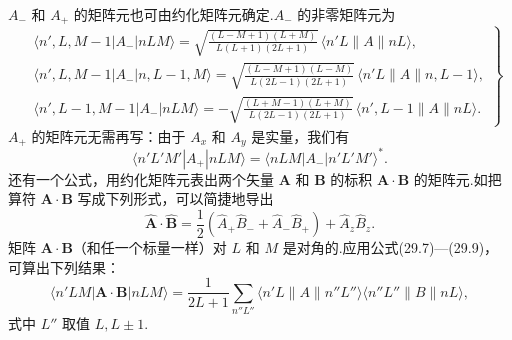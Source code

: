 $A_-$ 和 $A_+$ 的矩阵元也可由约化矩阵元确定.$A_-$ 的非零矩阵元为
\begin{equation}
\left.\begin{aligned}
  &\langle n',L,M-1|A_-|nLM\rangle
  =\sqrt{\frac{(L-M+1)(L+M)}{L(L+1)(2L+1)}}\,
  \langle n'L\parallel A\parallel nL\rangle,\\
  &\langle n',L,M-1|A_-|n,L-1,M\rangle
  =\sqrt{\frac{(L-M+1)(L-M)}{L(2L-1)(2L+1)}}\,
  \langle n'L\parallel A\parallel n,L-1\rangle,\\
  &\langle n',L-1,M-1|A_-|nLM\rangle
  =-\sqrt{\frac{(L+M-1)(L+M)}{L(2L-1)(2L+1)}}\,
  \langle n',L-1\parallel A\parallel nL\rangle.
\end{aligned}\right\}
\end{equation}
$A_+$ 的矩阵元无需再写：由于 $A_x$ 和 $A_y$ 是实量，我们有
\begin{equation}
  \langle n'L'M'|A_+|nLM\rangle
  =\langle nLM|A_-|n'L'M'\rangle^{*}.
\end{equation}
还有一个公式，用约化矩阵元表出两个矢量 $\boldsymbol{A}$ 和 $\boldsymbol{B}$ 的标积 $\boldsymbol{A}\cdot\boldsymbol{B}$ 的矩阵元.如把算符 $\boldsymbol{A}\cdot\boldsymbol{B}$ 写成下列形式，可以简捷地导出
\begin{equation}
  \hat{\boldsymbol{A}}\cdot\hat{\boldsymbol{B}}
  =\frac{1}{2}\left(\hat{A}_+\hat{B}_-+\hat{A}_-\hat{B}_+\right)
  +\hat{A}_z\hat{B}_z.
\end{equation}
矩阵 $\boldsymbol{A}\cdot\boldsymbol{B}$（和任一个标量一样）对 $L$ 和 $M$ 是对角的.应用公式(29.7)—(29.9)，可算出下列结果：
\begin{equation}
  \langle n'LM|\boldsymbol{A}\cdot\boldsymbol{B}|nLM\rangle
  =\frac{1}{2L+1}\sum_{n''L''}
  \langle n'L\parallel A\parallel n''L''\rangle
  \langle n''L''\parallel B\parallel nL\rangle,
\end{equation}
式中 $L''$ 取值 $L,L\pm1$.

